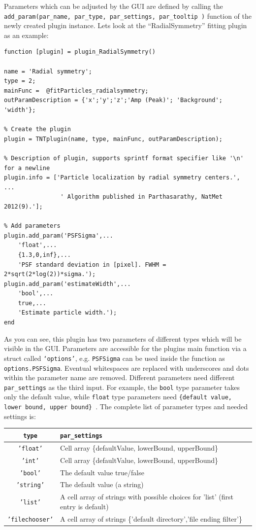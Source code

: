 \documentclass[11pt,onside]{report}
\numberwithin{equation}{chapter}
\begin{document}
Parameters which can be adjusted by the GUI are defined by calling the \texttt{add\_param(par\_name, par\_type, par\_settings, par\_tooltip )} function of the newly created plugin instance. Lets look at the ``RadialSymmetry'' fitting plugin as an example:
\begin{lstlisting}[style=Matlab-editor]
function [plugin] = plugin_RadialSymmetry()

name = 'Radial symmetry';
type = 2;
mainFunc =  @fitParticles_radialsymmetry;
outParamDescription = {'x';'y';'z';'Amp (Peak)'; 'Background'; 'width'};

% Create the plugin
plugin = TNTplugin(name, type, mainFunc, outParamDescription);

% Description of plugin, supports sprintf format specifier like '\n' for a newline
plugin.info = ['Particle localization by radial symmetry centers.', ...
                ' Algorithm published in Parthasarathy, NatMet 2012(9).'];

% Add parameters
plugin.add_param('PSFSigma',...
    'float',...
    {1.3,0,inf},...
    'PSF standard deviation in [pixel]. FWHM = 2*sqrt(2*log(2))*sigma.');
plugin.add_param('estimateWidth',...
    'bool',...
    true,...
    'Estimate particle width.');
end
\end{lstlisting}
 
As you can see, this plugin has two parameters of different types which will be visible in the GUI. Parameters are accessible for the plugins main function via a struct called \texttt{`options'}, e.g. \texttt{PSFSigma} can be used inside the function as \texttt{options.PSFSigma}. Eventual whitespaces are replaced with underscores and dots within the parameter name are removed. Different parameters need different \texttt{par\_settings} as the third input. For example, the \texttt{bool} type parameter takes only the default value, while \texttt{float} type parameters need \texttt{\{default value, lower bound, upper bound\} }. The complete list of parameter types and needed settings is: \\

\begin{tabular}{cl}
\toprule \texttt{type} & \texttt{par\_settings} \\ \midrule
  \texttt{'float'}  &Cell array \{defaultValue, lowerBound, upperBound\}\\
   \texttt{'int'}    &Cell array \{defaultValue, lowerBound, upperBound\}\\
   \texttt{'bool'}   &The default value true/false\\
   \texttt{'string'} & The default value (a string)\\
   \texttt{'list'}  & A cell array of strings with possible choices for 'list' (first entry is default)\\
   \texttt{'filechooser'} &A cell array of strings \{'default directory','file ending filter'\}\\
   \bottomrule
\end{tabular} \\
\end{document}
